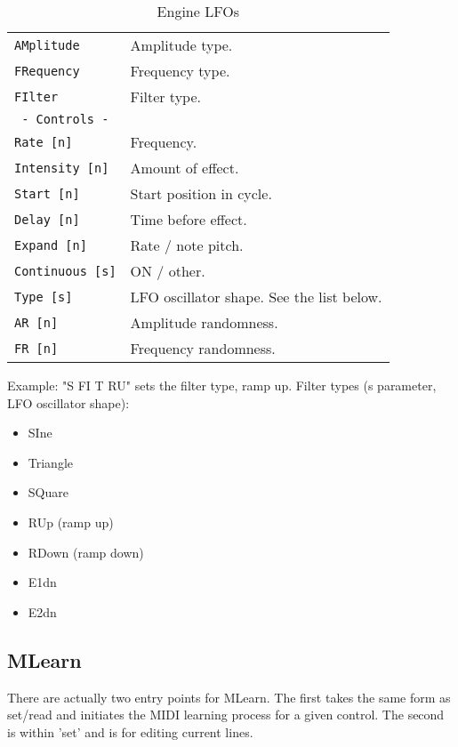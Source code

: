    \begin{table}[H]
      \centering
      \caption{Engine LFOs}
      \label{table:yoshimi_engine_lfos}
      \begin{tabular}{l l}

\texttt{AMplitude} &
   Amplitude type. \\
\texttt{FRequency} &
   Frequency type. \\
\texttt{FIlter} &
   Filter type. \\
\texttt{ - Controls - } & \\
\texttt{Rate [n]} &
   Frequency. \\
\texttt{Intensity [n]} &
   Amount of effect. \\
\texttt{Start [n]} &
   Start position in cycle. \\
\texttt{Delay [n]} &
   Time before effect. \\
\texttt{Expand [n]} &
   Rate / note pitch. \\
\texttt{Continuous [s]} &
   ON / other. \\
\texttt{Type [s]} &
   LFO oscillator shape. See the list below. \\
\texttt{AR [n]} &
   Amplitude randomness. \\
\texttt{FR [n]} &
   Frequency randomness. \\

      \end{tabular}
   \end{table}

Example: "S FI T RU" sets the filter type, ramp up.
Filter types (s parameter, LFO oscillator shape):

   \begin{itemize}
      \item SIne
      \item Triangle
      \item SQuare
      \item RUp (ramp up)
      \item RDown (ramp down)
      \item E1dn
      \item E2dn
   \end{itemize}

\subsection{MLearn}
\label{subsec:command_line_mlearn}
   There are actually two entry points for MLearn. The first takes the same form
   as set/read and initiates the MIDI learning process for a given control.
   The second is within 'set' and is for editing current lines.

